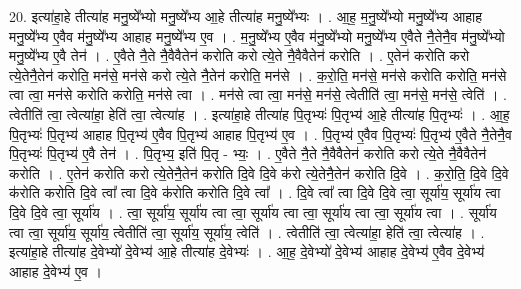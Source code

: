 \documentclass[17pt]{extarticle}
\begin{document}
20. इत्या॑हा॒हे तीत्या॑ह मनु॒ष्ये᳚भ्यो मनु॒ष्ये᳚भ्य आ॒हे तीत्या॑ह मनु॒ष्ये᳚भ्यः । . आ॒ह॒ म॒नु॒ष्ये᳚भ्यो मनु॒ष्ये᳚भ्य आहाह मनु॒ष्ये᳚भ्य ए॒वैव म॑नु॒ष्ये᳚भ्य आहाह मनु॒ष्ये᳚भ्य ए॒व । . म॒नु॒ष्ये᳚भ्य ए॒वैव म॑नु॒ष्ये᳚भ्यो मनु॒ष्ये᳚भ्य ए॒वैते नै॒तेनै॒व म॑नु॒ष्ये᳚भ्यो मनु॒ष्ये᳚भ्य ए॒वै तेन॑ । . ए॒वैते नै॒ते नै॒वैवैतेन॑ करोति करो त्ये॒ते नै॒वैवैतेन॑ करोति । . ए॒तेन॑ करोति करो त्ये॒तेनै॒तेन॑ करोति॒ मन॑से॒ मन॑से करो त्ये॒ते नै॒तेन॑ करोति॒ मन॑से । . क॒रो॒ति॒ मन॑से॒ मन॑से करोति करोति॒ मन॑से त्वा त्वा॒ मन॑से करोति करोति॒ मन॑से त्वा । . मन॑से त्वा त्वा॒ मन॑से॒ मन॑से॒ त्वेतीति॑ त्वा॒ मन॑से॒ मन॑से॒ त्वेति॑ । . त्वेतीति॑ त्वा॒ त्वेत्या॑हा॒ हेति॑ त्वा॒ त्वेत्या॑ह । . इत्या॑हा॒हे तीत्या॑ह पि॒तृभ्यः॑ पि॒तृभ्य॑ आ॒हे तीत्या॑ह पि॒तृभ्यः॑ । . आ॒ह॒ पि॒तृभ्यः॑ पि॒तृभ्य॑ आहाह पि॒तृभ्य॑ ए॒वैव पि॒तृभ्य॑ आहाह पि॒तृभ्य॑ ए॒व । . पि॒तृभ्य॑ ए॒वैव पि॒तृभ्यः॑ पि॒तृभ्य॑ ए॒वैते नै॒तेनै॒व पि॒तृभ्यः॑ पि॒तृभ्य॑ ए॒वै तेन॑ । . पि॒तृभ्य॒ इति॑ पि॒तृ - भ्यः॒ । . ए॒वैते नै॒ते नै॒वैवैतेन॑ करोति करो त्ये॒ते नै॒वैवैतेन॑ करोति । . ए॒तेन॑ करोति करो त्ये॒तेनै॒तेन॑ करोति दि॒वे दि॒वे क॑रो त्ये॒तेनै॒तेन॑ करोति दि॒वे । . क॒रो॒ति॒ दि॒वे दि॒वे क॑रोति करोति दि॒वे त्वा᳚ त्वा दि॒वे क॑रोति करोति दि॒वे त्वा᳚ । . दि॒वे त्वा᳚ त्वा दि॒वे दि॒वे त्वा॒ सूर्या॑य॒ सूर्या॑य त्वा दि॒वे दि॒वे त्वा॒ सूर्या॑य । . त्वा॒ सूर्या॑य॒ सूर्या॑य त्वा त्वा॒ सूर्या॑य त्वा त्वा॒ सूर्या॑य त्वा त्वा॒ सूर्या॑य त्वा । . सूर्या॑य त्वा त्वा॒ सूर्या॑य॒ सूर्या॑य॒ त्वेतीति॑ त्वा॒ सूर्या॑य॒ सूर्या॑य॒ त्वेति॑ । . त्वेतीति॑ त्वा॒ त्वेत्या॑हा॒ हेति॑ त्वा॒ त्वेत्या॑ह । . इत्या॑हा॒हे तीत्या॑ह दे॒वेभ्यो॑ दे॒वेभ्य॑ आ॒हे तीत्या॑ह दे॒वेभ्यः॑ । . आ॒ह॒ दे॒वेभ्यो॑ दे॒वेभ्य॑ आहाह दे॒वेभ्य॑ ए॒वैव दे॒वेभ्य॑ आहाह दे॒वेभ्य॑ ए॒व । \newline
\end{document}
